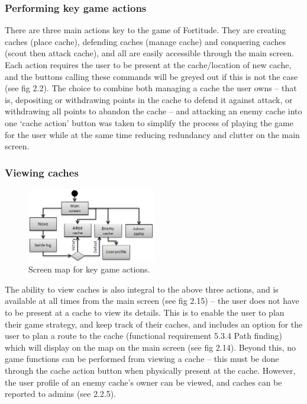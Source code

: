 \newpage
\subsubsection{Performing key game actions}

There are three main actions key to the game of Fortitude. They are creating caches (place cache), defending caches (manage cache) and conquering caches (scout then attack cache), and all are easily accessible through the main screen. Each action requires the user to be present at the cache/location of new cache, and the buttons calling these commands will be greyed out if this is not the case (see fig 2.2). The choice to combine both managing a cache the user owns – that is, depositing or withdrawing points in the cache to defend it against attack, or withdrawing all points to abandon the cache – and attacking an enemy cache into one ‘cache action’ button was taken to simplify the process of playing the game for the user while at the same time reducing redundancy and clutter on the main screen.

\subsubsection{Viewing caches}

\begin{figure}
	\vspace{-85pt}
	\begin{center}
	\includegraphics[width=0.5\textwidth]{images/viewing_caches}
	\caption{Screen map for key game actions.}
	\label{viewing_caches}
	\vspace{-10pt}
	\end{center}
\end{figure}
The ability to view caches is also integral to the above three actions, and is available at all times from the main screen (see fig 2.15) – the user does not have to be present at a cache to view its details. This is to enable the user to plan their game strategy, and keep track of their caches, and includes an option for the user to plan a route to the cache (functional requirement 5.3.4 Path finding) which will display on the map on the main screen (see fig 2.14). Beyond this, no game functions can be performed from viewing a cache – this must be done through the cache action button when physically present at the cache. However, the user profile of an enemy cache’s owner can be viewed, and caches can be reported to admins (see 2.2.5).

